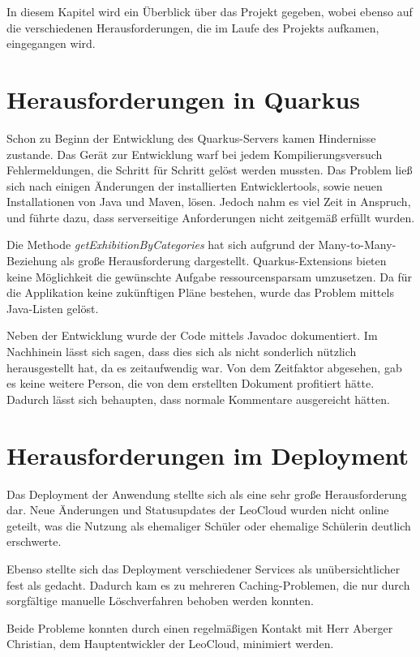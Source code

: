 In diesem Kapitel wird ein Überblick über das Projekt gegeben, wobei ebenso auf die verschiedenen Herausforderungen, die im Laufe des Projekts aufkamen, eingegangen wird.  

\section{Herausforderungen in Quarkus}

Schon zu Beginn der Entwicklung des Quarkus-Servers kamen Hindernisse zustande. 
Das Gerät zur Entwicklung warf bei jedem Kompilierungsversuch Fehlermeldungen, die Schritt für Schritt gelöst werden mussten. 
Das Problem ließ sich nach einigen Änderungen der installierten Entwicklertools, sowie neuen Installationen von Java und Maven, lösen. 
Jedoch nahm es viel Zeit in Anspruch, und führte dazu, dass serverseitige Anforderungen nicht zeitgemäß erfüllt wurden. 

Die Methode \emph{getExhibitionByCategories} hat sich aufgrund der Many-to-Many-Beziehung als große Herausforderung dargestellt. 
Quarkus-Extensions bieten keine Möglichkeit die gewünschte Aufgabe ressourcensparsam umzusetzen. 
Da für die Applikation keine zukünftigen Pläne bestehen, wurde das Problem mittels Java-Listen gelöst. 

Neben der Entwicklung wurde der Code mittels Javadoc dokumentiert. 
Im Nachhinein lässt sich sagen, dass dies sich als nicht sonderlich nützlich herausgestellt hat, da es zeitaufwendig war.
Von dem Zeitfaktor abgesehen, gab es keine weitere Person, die von dem erstellten Dokument profitiert hätte. 
Dadurch lässt sich behaupten, dass normale Kommentare ausgereicht hätten. 

\section{Herausforderungen im Deployment}

Das Deployment der Anwendung stellte sich als eine sehr große Herausforderung dar. 
Neue Änderungen und Statusupdates der LeoCloud wurden nicht online geteilt, was die Nutzung als ehemaliger Schüler oder ehemalige Schülerin deutlich erschwerte. 

Ebenso stellte sich das Deployment verschiedener Services als unübersichtlicher fest als gedacht. 
Dadurch kam es zu mehreren Caching-Problemen, die nur durch sorgfältige manuelle Löschverfahren behoben werden konnten. 

Beide Probleme konnten durch einen regelmäßigen Kontakt mit Herr Aberger Christian, dem Hauptentwickler der LeoCloud, minimiert werden.

